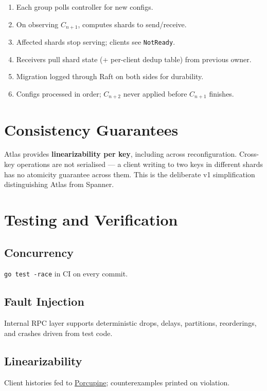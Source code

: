 \documentclass[11pt,a4paper]{article}
\begin{document}
\begin{enumerate}[leftmargin=1.5em,itemsep=0.2em]
  \item Each group polls controller for new configs.
  \item On observing $C_{n+1}$, computes shards to send/receive.
  \item Affected shards stop serving; clients see \texttt{NotReady}.
  \item Receivers pull shard state (+ per-client dedup table) from previous owner.
  \item Migration logged through Raft on both sides for durability.
  \item Configs processed in order; $C_{n+2}$ never applied before $C_{n+1}$ finishes.
\end{enumerate}

\section{Consistency Guarantees}

Atlas provides \textbf{linearizability per key}, including across reconfiguration. Cross-key operations are not serialised --- a client writing to two keys in different shards has no atomicity guarantee across them. This is the deliberate v1 simplification distinguishing Atlas from Spanner.

\section{Testing and Verification}

\subsection{Concurrency}
\texttt{go test -race} in CI on every commit.

\subsection{Fault Injection}
Internal RPC layer supports deterministic drops, delays, partitions, reorderings, and crashes driven from test code.

\subsection{Linearizability}
Client histories fed to \href{https://github.com/anishathalye/porcupine}{Porcupine}; counterexamples printed on violation.
\end{document}
